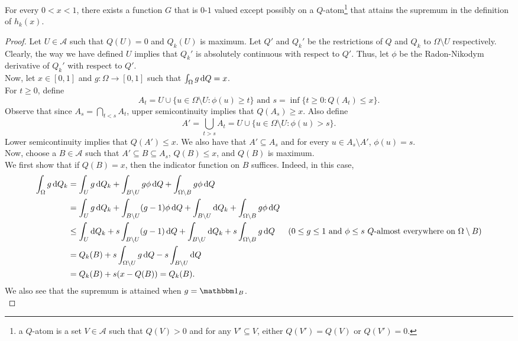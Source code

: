 \begin{lemma}
\label{hk distance supremum attained}
	For every $0<x<1$, there exists a function $G$ that is $0$-$1$ valued except possibly on a $Q$-atom\footnote{a $Q$-atom is a set $V\in\mathcal{A}$ such that $Q(V)>0$ and for any $V'\subseteq V$, either $Q(V')=Q(V)$ or $Q(V')=0$.} that attains the supremum in the definition of $h_k(x)$.
\end{lemma}
\begin{proof}
	Let $U\in\mathcal{A}$ such that $Q(U)=0$ and $Q_k(U)$ is maximum. Let $Q'$ and $Q_k'$ be the restrictions of $Q$ and $Q_k$ to $\Omega\setminus U$ respectively. Clearly, the way we have defined $U$ implies that $Q_k'$ is absolutely continuous with respect to $Q'$. Thus, let $\phi$ be the Radon-Nikodym derivative of $Q_k'$ with respect to $Q'$.\\
	Now, let $x\in[0,1]$ and $g:\Omega\to[0,1]$ such that $\int_\Omega g\operatorname{d}\!{Q} = x$.\\
	For $t\geq 0$, define
	\[ A_t = U \cup \{u \in \Omega\setminus U : \phi(u) \geq t\}\text{ and }s=\inf\{t\geq 0 : Q(A_t) \leq x\}. \]
	Observe that since $A_s = \bigcap_{t<s}A_t$, upper semicontinuity implies that $Q(A_s)\geq x$. Also define
	\[ A' = \bigcup_{t>s} A_t = U \cup \{u \in \Omega\setminus U : \phi(u) > s\}. \]
	Lower semicontinuity implies that $Q(A')\leq x$. We also have that $A'\subseteq A_s$ and for every $u\in A_s\setminus A'$, $\phi(u)=s$.\\
	Now, choose a $B\in\mathcal{A}$ such that $A'\subseteq B\subseteq A_s$, $Q(B)\leq x$, and $Q(B)$ is maximum.\\
	We first show that if $Q(B)=x$, then the indicator function on $B$ suffices. Indeed, in this case,
	\begin{align*}
		\int_\Omega g\d{Q}_k &= \int_U g\d{Q}_k + \int_{B\setminus U} g\phi\d{Q} + \int_{\Omega\setminus B} g\phi\d{Q} \\
		&= \int_U g\d{Q}_k + \int_{B\setminus U} (g-1)\phi\d{Q} + \int_{B\setminus U} \d{Q}_k + \int_{\Omega\setminus B} g\phi\d{Q} \\
		&\leq \int_U \d{Q}_k + s\int_{B\setminus U} (g-1)\d{Q} + \int_{B\setminus U} \d{Q}_k + s\int_{\Omega\setminus B} g \d{Q} & \text{($0\leq g\leq 1$ and $\phi\leq s$ $Q$-almost everywhere on $\Omega\setminus B$)} \\
		&= Q_k(B) + s\int_{\Omega\setminus U} g\d{Q} - s\int_{B\setminus U}\d{Q} \\
		&= Q_k(B) + s(x - Q(B)) = Q_k(B).
	\end{align*}
	We also see that the supremum is attained when $g=\indic_B$.\\

\end{proof}
